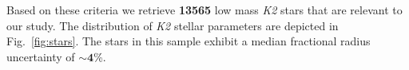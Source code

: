 \documentclass[modern]{aastex63}
\newcommand\kepler{\emph{Kepler}}
\newcommand\ktwo{\emph{K2}}
\begin{document}
\noindent Based on these criteria we retrieve \textbf{13565} low mass \ktwo{} stars that are relevant to our study.
The distribution of \ktwo{} stellar parameters are depicted in Fig.~\ref{fig:stars}.
The stars in this sample exhibit a median fractional radius uncertainty of $\sim \mathbf{4}$\%.

\begin{figure*}
  \centering
  \caption{Stellar samples from \kepler{} and \ktwo{.} Distributions of Kepler magnitudes, effective temperatures,
    stellar radii, and stellar masses for stars in our final stellar sample from either \kepler{} (\emph{left panels})
    or \ktwo{} (\emph{right panels}).}
  \label{fig:stars}
\end{figure*}





{}

\end{document}
